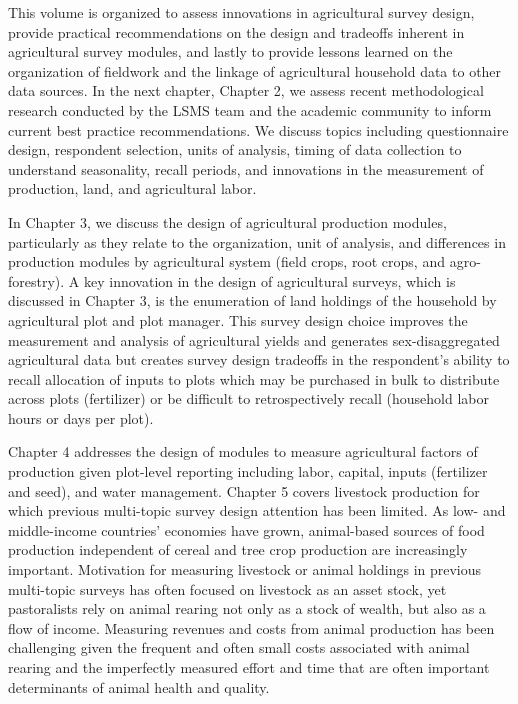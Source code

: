 \documentclass[
]{book}
\begin{document}
This volume is organized to assess innovations in agricultural survey design, provide practical recommendations on the design and tradeoffs inherent in agricultural survey modules, and lastly to provide lessons learned on the organization of fieldwork and the linkage of agricultural household data to other data sources. In the next chapter, Chapter 2, we assess recent methodological research conducted by the LSMS team and the academic community to inform current best practice recommendations. We discuss topics including questionnaire design, respondent selection, units of analysis, timing of data collection to understand seasonality, recall periods, and innovations in the measurement of production, land, and agricultural labor.

In Chapter 3, we discuss the design of agricultural production modules, particularly as they relate to the organization, unit of analysis, and differences in production modules by agricultural system (field crops, root crops, and agro-forestry). A key innovation in the design of agricultural surveys, which is discussed in Chapter 3, is the enumeration of land holdings of the household by agricultural plot and plot manager. This survey design choice improves the measurement and analysis of agricultural yields and generates sex-disaggregated agricultural data but creates survey design tradeoffs in the respondent's ability to recall allocation of inputs to plots which may be purchased in bulk to distribute across plots (fertilizer) or be difficult to retrospectively recall (household labor hours or days per plot).

Chapter 4 addresses the design of modules to measure agricultural factors of production given plot-level reporting including labor, capital, inputs (fertilizer and seed), and water management. Chapter 5 covers livestock production for which previous multi-topic survey design attention has been limited. As low- and middle-income countries' economies have grown, animal-based sources of food production independent of cereal and tree crop production are increasingly important. Motivation for measuring livestock or animal holdings in previous multi-topic surveys has often focused on livestock as an asset stock, yet pastoralists rely on animal rearing not only as a stock of wealth, but also as a flow of income. Measuring revenues and costs from animal production has been challenging given the frequent and often small costs associated with animal rearing and the imperfectly measured effort and time that are often important determinants of animal health and quality.
\end{document}
